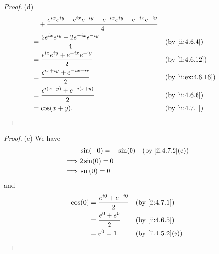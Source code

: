 \begin{proof}{(d)}
\begin{align*}
     & \quad + \dfrac{e^{i x} e^{i y} - e^{i x} e^{- i y} - e^{- i x} e^{i y} + e^{- i x} e^{- i y}}{4}                                                         \\
     & = \dfrac{2 e^{i x} e^{i y} + 2 e^{- i x} e^{- i y}}{4}                                                                            &  & \by{ii:4.6.4}     \\
     & = \dfrac{e^{i x} e^{i y} + e^{- i x} e^{- i y}}{2}                                                                                &  & \by{ii:4.6.12}    \\
     & = \dfrac{e^{i x + i y} + e^{- i x - i y}}{2}                                                                                      &  & \by{ii:ex:4.6.16} \\
     & = \dfrac{e^{i (x + y)} + e^{- i (x + y)}}{2}                                                                                      &  & \by{ii:4.6.6}     \\
     & = \cos(x + y).                                                                                                                    &  & \by{ii:4.7.1}
  \end{align*}
\end{proof}

\begin{proof}{(e)}
  We have
  \begin{align*}
             & \sin(-0) = -\sin(0) &  & \by{ii:4.7.2}[c] \\
    \implies & 2 \sin(0) = 0                             \\
    \implies & \sin(0) = 0
  \end{align*}
  and
  \begin{align*}
    \cos(0) & = \dfrac{e^{i 0} + e^{- i 0}}{2} &  & \by{ii:4.7.1}    \\
            & = \dfrac{e^{0} + e^{0}}{2}       &  & \by{ii:4.6.5}    \\
            & = e^0 = 1.                       &  & \by{ii:4.5.2}[e]
  \end{align*}
\end{proof}

